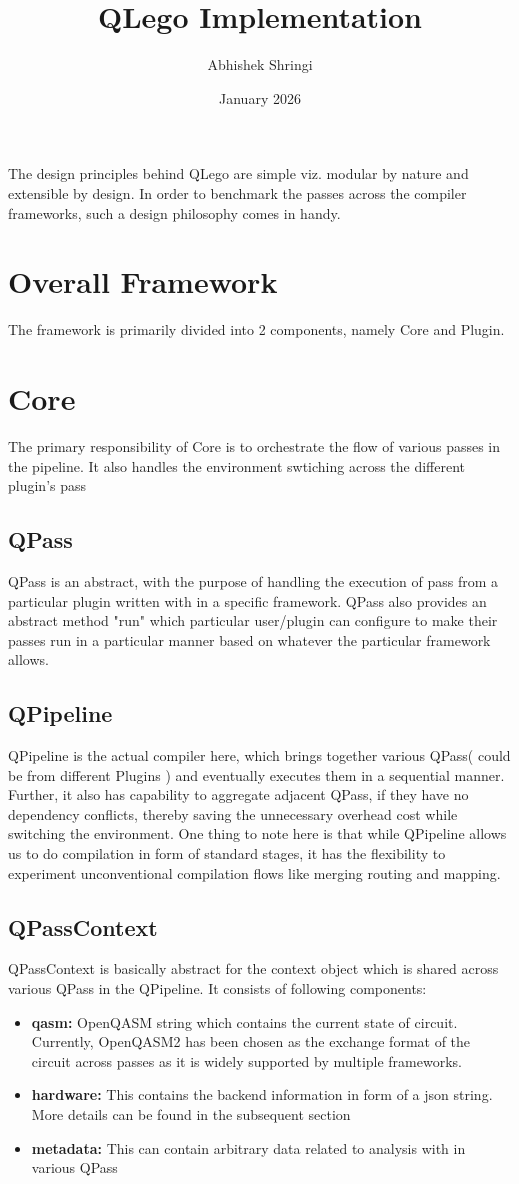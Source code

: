 \documentclass[11pt]{article}
\title{QLego Implementation}
\author{Abhishek Shringi}
\date{January 2026}
\begin{document}
\maketitle
The design principles behind QLego are simple viz. modular by nature and extensible by design. In order to benchmark the passes across the compiler frameworks, such a design philosophy comes in handy.
\section{Overall Framework}
The framework is primarily divided into 2 components, namely Core and Plugin.
\section{Core}
The primary responsibility of Core is to orchestrate the flow of various passes in the pipeline. It also handles the environment swtiching across the different plugin's pass
\subsection{QPass}
QPass is an abstract, with the purpose of handling the execution of pass from a particular plugin written with in a specific framework. QPass also provides an abstract method "run" which particular user/plugin can configure to make their passes run in a particular manner based on whatever the particular framework allows.
\subsection{QPipeline}
QPipeline is the actual compiler here, which brings together various QPass( could be from different Plugins ) and eventually executes them in a sequential manner. Further, it also has capability to aggregate adjacent QPass, if they have no dependency conflicts, thereby saving the unnecessary overhead cost while switching the environment. One thing to note here is that while QPipeline allows us to do compilation in form of standard stages, it has the flexibility to experiment unconventional compilation flows like merging routing and mapping.
\subsection{QPassContext}
QPassContext is basically abstract for the context object which is shared across various QPass in the QPipeline. It consists of following components:
\begin{itemize}
    \item \textbf{qasm:} OpenQASM string which contains the current state of circuit. Currently, OpenQASM2 has been chosen as the exchange format of the circuit across passes as it is widely supported by multiple frameworks.
    \item \textbf{hardware:} This contains the backend information in form of a json string. More details can be found in the subsequent section
    \item \textbf{metadata:} This can contain arbitrary data related to analysis with in various QPass
\end{itemize}
 
\end{document}
